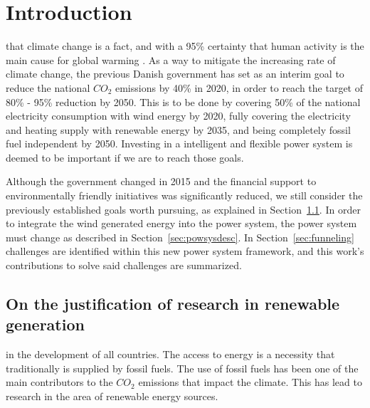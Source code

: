 \chapter{Introduction}

 that climate change is a fact, and with a 95\% certainty that human activity is the main cause for global warming . As a way to mitigate the increasing rate of climate change, the previous Danish government  has set as an interim goal to reduce the national $CO_2$ emissions by 40\% in 2020, in order to reach the target of 80\% - 95\% reduction by 2050. This is to be done by covering 50\% of the national electricity consumption with wind energy by 2020, fully covering the electricity and heating supply with renewable energy by 2035, and being completely fossil fuel independent by 2050. Investing in a intelligent and flexible power system is deemed to be important if we are to reach those goals.

Although the government  changed in 2015 and the financial support to environmentally friendly initiatives was significantly reduced, we still consider the previously established goals worth pursuing, as explained in Section~\ref{sec:justification}. In order to integrate the wind generated energy into the power system, the power system must change as described in Section~\ref{sec:powsysdesc}. In Section~\ref{sec:funneling} challenges are identified within this new power system framework, and this work's contributions to solve said challenges are summarized.
\section{On the justification of research in renewable generation} %
\label{sec:justification}

 in the development of all countries. The access to energy is a necessity that traditionally is supplied by fossil fuels. The use of fossil fuels has been one of the main contributors to the $CO_2$ emissions that impact the climate. This has lead to research in the area of renewable energy sources.

